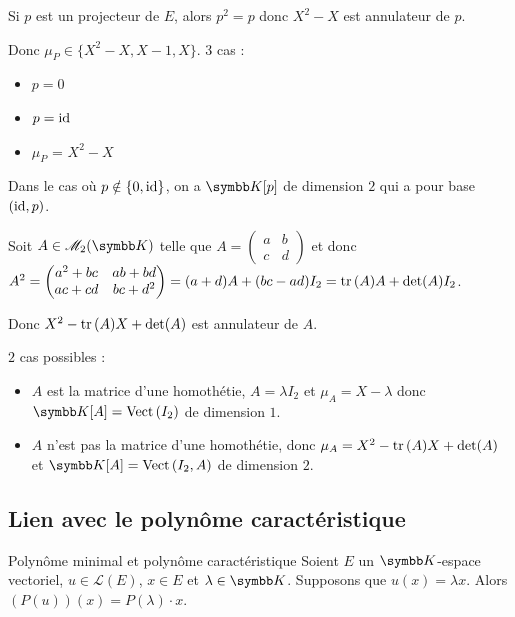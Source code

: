 \begin{exemple}
    Si $p$ est un projecteur de $E$, alors $p^2 = p$ donc $X^2 - X$ est annulateur de $p$.

    Donc $\mu_P \in \{X^2 - X, X - 1, X\}$. 3 cas : 
    \begin{itemize}
        \item $p = 0$
        \item $p = \operatorname{id}$
        \item $\mu_P$ = $X^2 - X$ 
    \end{itemize}

    Dans le cas où $p \notin \{0, \operatorname{id}\}$, on a $\K[p]$ de dimension $2$ qui a pour base $(\operatorname{id}, p)$.

    \lvspace Soit $A \in \mathscr M_2(\K)$ telle que $A = \begin{pmatrix}
        a & b \\
        c & d
    \end{pmatrix}$ et donc $A^2 = \begin{pmatrix}
        a^2 + bc & ab + bd \\
        ac + cd & bc + d^2
    \end{pmatrix} = (a + d) A  + (b c - ad) I_2 = \operatorname{tr} \,(A) A + \det(A) I_2$.

    Donc $X^2 - \operatorname{tr} \,(A) X + \det(A)$ est annulateur de $A$.

    $2$ cas possibles : 
    \begin{itemize}
        \item $A$ est la matrice d'une homothétie, $A = \lambda I_2$ et $\mu_A = X - \lambda$ donc 
        $\K[A] = \Vect(I_2)$ de dimension $1$.
        \item $A$ n'est pas la matrice d'une homothétie, donc $\mu_A = X^2 - \operatorname{tr} \,(A) X + \det(A)$ et 
        $\K[A] = \Vect(I_2, A)$ de dimension $2$.
    \end{itemize}
\end{exemple}

\subsection{Lien avec le polynôme caractéristique}

\begin{proposition}{Polynôme minimal et polynôme caractéristique}{}
    Soient $E$ un $\K$-espace vectoriel, $u \in \mathscr L(E)$, $x \in E$ et 
    $\lambda \in \K$. Supposons que $u(x) = \lambda x$. Alors $(P(u))(x) = P(\lambda)\cdot x$.
\end{proposition}

